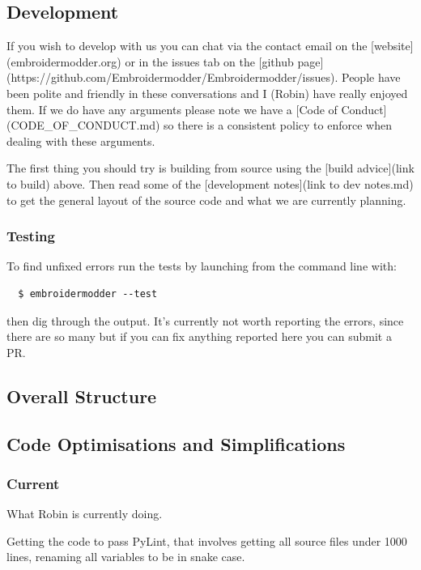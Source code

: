\documentclass[a4paper, 11pt]{report}
\begin{document}
\subsection{Development}

If you wish to develop with us you can chat via the contact email
on the [website](embroidermodder.org) or in the issues tab on the
[github page](https://github.com/Embroidermodder/Embroidermodder/issues).
People have been polite and friendly in these conversations and I (Robin)
have really enjoyed them.
If we do have any arguments please note we have a
[Code of Conduct](CODE\_OF\_CONDUCT.md) so there is a consistent policy to
enforce when dealing with these arguments.

The first thing you should try is building from source using the [build advice](link to build)
above. Then read some of the [development notes](link to dev notes.md) to get the general
layout of the source code and what we are currently planning.

\subsubsection{Testing}

To find unfixed errors run the tests by launching from the command line with:

\begin{verbatim}
  $ embroidermodder --test
\end{verbatim}

then dig through the output. It's currently not worth reporting the errors, since
there are so many but if you can fix anything reported here you can submit a PR.

\subsection{Overall Structure}

\subsection{Code Optimisations and Simplifications}

\subsubsection{Current}

What Robin is currently doing.

Getting the code to pass PyLint, that involves getting all source files
under 1000 lines, renaming all variables to be in snake case.
\end{document}
